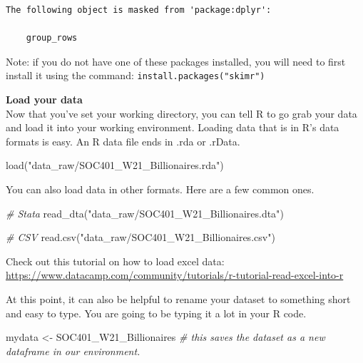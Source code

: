 \documentclass[
]{book}
\newenvironment{Shaded}{\begin{snugshade}}{\end{snugshade}}
\newcommand{\CommentTok}[1]{\textcolor[rgb]{0.56,0.35,0.01}{\textit{#1}}}
\newcommand{\FunctionTok}[1]{\textcolor[rgb]{0.00,0.00,0.00}{#1}}
\newcommand{\NormalTok}[1]{#1}
\newcommand{\OtherTok}[1]{\textcolor[rgb]{0.56,0.35,0.01}{#1}}
\newcommand{\StringTok}[1]{\textcolor[rgb]{0.31,0.60,0.02}{#1}}
\begin{document}
\begin{verbatim}
The following object is masked from 'package:dplyr':

    group_rows
\end{verbatim}

Note: if you do not have one of these packages installed, you will need to first install it using the command: \texttt{install.packages("skimr")}

\textbf{Load your data}\\
Now that you've set your working directory, you can tell R to go grab your data and load it into your working environment.
Loading data that is in R's data formats is easy. An R data file ends in .rda or .rData.

\begin{Shaded}
\begin{Highlighting}[]
\FunctionTok{load}\NormalTok{(}\StringTok{"data\_raw/SOC401\_W21\_Billionaires.rda"}\NormalTok{)}
\end{Highlighting}
\end{Shaded}

You can also load data in other formats. Here are a few common ones.

\begin{Shaded}
\begin{Highlighting}[]
\CommentTok{\# Stata}
\FunctionTok{read\_dta}\NormalTok{(}\StringTok{"data\_raw/SOC401\_W21\_Billionaires.dta"}\NormalTok{)}

\CommentTok{\# CSV}
\FunctionTok{read.csv}\NormalTok{(}\StringTok{"data\_raw/SOC401\_W21\_Billionaires.csv"}\NormalTok{)}
\end{Highlighting}
\end{Shaded}

Check out this tutorial on how to load excel data:
\url{https://www.datacamp.com/community/tutorials/r-tutorial-read-excel-into-r}

At this point, it can also be helpful to rename your dataset to something short and easy to type. You are going to be typing it a lot in your R code.

\begin{Shaded}
\begin{Highlighting}[]
\NormalTok{mydata }\OtherTok{\textless{}{-}}\NormalTok{ SOC401\_W21\_Billionaires }\CommentTok{\# this saves the dataset as a new dataframe in our environment.}
\end{Highlighting}
\end{Shaded}
\end{document}
